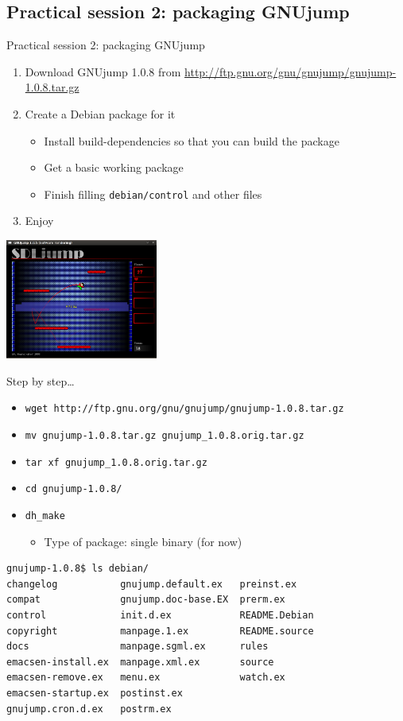\documentclass[10pt,final]{beamer}
\begin{document}
\subsection{Practical session 2: packaging GNUjump}
\begin{frame}{Practical session 2: packaging GNUjump}
\begin{enumerate}
	\item Download GNUjump 1.0.8 from
		\url{http://ftp.gnu.org/gnu/gnujump/gnujump-1.0.8.tar.gz}
		\br
	\item Create a Debian package for it
		\begin{itemize}
			\item Install build-dependencies so that you can build the package
			\item Get a basic working package
			\item Finish filling \texttt{debian/control} and other files
		\end{itemize}
		\br
	\item Enjoy
\end{enumerate}
\centerline{\includegraphics[width=5cm]{figs/gnujump.png}}
\end{frame}

\begin{frame}[fragile=singleslide]{Step by step\ldots}
\begin{itemize}
	\item \texttt{wget http://ftp.gnu.org/gnu/gnujump/gnujump-1.0.8.tar.gz}
		\hbr
	\item \texttt{mv gnujump-1.0.8.tar.gz gnujump\_1.0.8.orig.tar.gz}
		\hbr
	\item \texttt{tar xf gnujump\_1.0.8.orig.tar.gz}
		\hbr
	\item \texttt{cd gnujump-1.0.8/}
		\hbr
	\item \texttt{dh\_make}
	\begin{itemize}
		\item \small Type of package: single binary (for now)
	\end{itemize}
\end{itemize}
\begin{lstlisting}[basicstyle=\ttfamily\small]
gnujump-1.0.8$ ls debian/
changelog           gnujump.default.ex   preinst.ex
compat              gnujump.doc-base.EX  prerm.ex
control             init.d.ex            README.Debian
copyright           manpage.1.ex         README.source
docs                manpage.sgml.ex      rules
emacsen-install.ex  manpage.xml.ex       source
emacsen-remove.ex   menu.ex              watch.ex
emacsen-startup.ex  postinst.ex
gnujump.cron.d.ex   postrm.ex
\end{lstlisting}
\end{frame}
\end{document}
